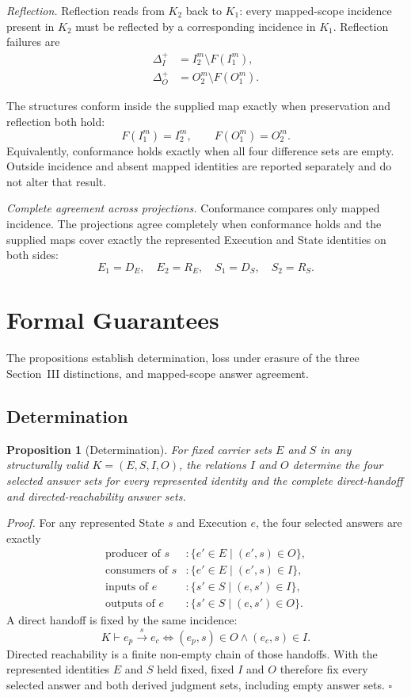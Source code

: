 \documentclass[conference]{IEEEtran}
\theoremstyle{tideproposition}
\newtheorem{proposition}{Proposition}
\newcommand{\direct}[3]{#1\xrightarrow{#2}#3}
\begin{document}
\emph{Reflection.}
Reflection reads from $K_2$ back to $K_1$: every mapped-scope incidence present in $K_2$ must be reflected by a corresponding incidence in $K_1$. Reflection failures are
\begin{align}
\Delta_I^+&=I_2^m\setminus F(I_1^m),\\
\Delta_O^+&=O_2^m\setminus F(O_1^m).
\label{eq:reflection-deltas}
\end{align}

The structures conform inside the supplied map exactly when preservation and reflection both hold:
\begin{equation}
F(I_1^m)=I_2^m,
\qquad
F(O_1^m)=O_2^m.
\label{eq:scoped-conformance}
\end{equation}
Equivalently, conformance holds exactly when all four difference sets are empty. Outside incidence and absent mapped identities are reported separately and do not alter that result.

\emph{Complete agreement across projections.}
Conformance compares only mapped incidence. The projections agree completely when conformance holds and the supplied maps cover exactly the represented Execution and State identities on both sides:
\begin{equation}
E_1=D_E,\quad E_2=R_E,\quad
S_1=D_S,\quad S_2=R_S.
\label{eq:projection-coverage}
\end{equation}

\section{Formal Guarantees}
The propositions establish determination, loss under erasure of the three Section~III distinctions, and mapped-scope answer agreement.

\subsection{Determination}
\begin{proposition}[Determination]\label{prop:determination}
For fixed carrier sets $E$ and $S$ in any structurally valid $K=(E,S,I,O)$, the relations $I$ and $O$ determine the four selected answer sets for every represented identity and the complete direct-handoff and directed-reachability answer sets.
\end{proposition}
\noindent\emph{Proof.}
For any represented State $s$ and Execution $e$, the four selected answers are exactly
\begin{align*}
\text{producer of }s &: \{e'\in E\mid(e',s)\in O\},\\
\text{consumers of }s &: \{e'\in E\mid(e',s)\in I\},\\
\text{inputs of }e &: \{s'\in S\mid(e,s')\in I\},\\
\text{outputs of }e &: \{s'\in S\mid(e,s')\in O\}.
\end{align*}
A direct handoff is fixed by the same incidence:
\[
K\vdash\direct{e_p}{s}{e_c}
\Longleftrightarrow
(e_p,s)\in O\land(e_c,s)\in I.
\]
Directed reachability is a finite non-empty chain of those handoffs. With the represented identities $E$ and $S$ held fixed, fixed $I$ and $O$ therefore fix every selected answer and both derived judgment sets, including empty answer sets. \hfill$\square$
\end{document}
